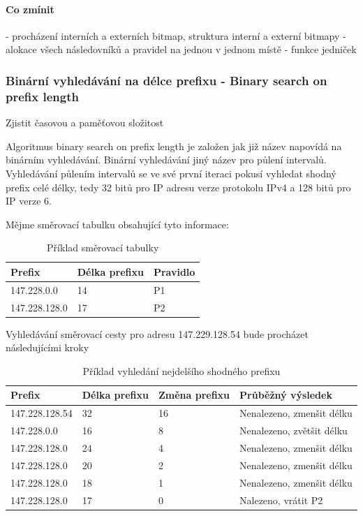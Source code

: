 \paragraph{Co zmínit}
- procházení interních a externích bitmap, struktura interní a externí bitmapy
- alokace všech následovníků a pravidel na jednou v jednom místě
- funkce jedniček

\subsubsection{Binární vyhledávání na délce prefixu - Binary search on prefix length} %
Zjistit časovou a paměťovou složitost

Algoritmus binary search on prefix length je založen jak již název napovídá na binárním vyhledávání.
Binární vyhledávání jiný název pro půlení intervalů. Vyhledávání půlením intervalů
se ve své první iteraci pokusí vyhledat shodný prefix celé délky, tedy 32 bitů pro IP adresu
verze protokolu IPv4 a 128 bitů pro IP verze 6.

Mějme směrovací tabulku obsahující tyto informace:

\begin{table}[!htbp]
	\center
    \begin{tabular}{|l|l|l|}
    \hline
    Prefix        & Délka prefixu & Pravidlo \\ \hline
    147.228.0.0   & 14            & P1       \\ \hline
    147.228.128.0 & 17            & P2       \\ \hline
    \end{tabular}
    \caption{Příklad směrovací tabulky}
\end{table}

Vyhledávání směrovací cesty pro adresu 147.229.128.54 bude procházet následujícími kroky

\begin{table}[!htbp]
	\center
    \begin{tabular}{|l|l|l|l|}
    \hline
    Prefix & Délka prefixu  & Změna prefixu & Průběžný výsledek \\ \hline
    147.228.128.54 & 32 & 16 & Nenalezeno, zmenšit délku \\ \hline
    147.228.0.0 & 16 & 8 & Nenalezeno, zvětšit délku \\ \hline
    147.228.128.0 & 24 & 4 & Nenalezeno, zmenšit délku \\ \hline
    147.228.128.0 & 20 & 2 & Nenalezeno, zmenšit délku \\ \hline
    147.228.128.0 & 18 & 1 & Nenalezeno, zmenšit délku \\ \hline
    147.228.128.0 & 17 & 0 & Nalezeno, vrátit P2 \\ \hline
    \end{tabular}
    \caption{Příklad vyhledání nejdelšího shodného prefixu}
\end{table}


